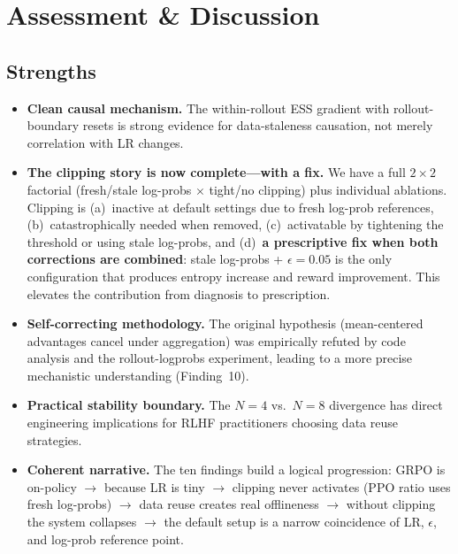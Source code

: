 \documentclass[11pt,a4paper]{article}
\begin{document}
\section{Assessment \& Discussion}
\label{sec:assessment}

\subsection{Strengths}

\begin{itemize}[leftmargin=*]
  \item \textbf{Clean causal mechanism.} The within-rollout ESS gradient with
    rollout-boundary resets is strong evidence for data-staleness causation,
    not merely correlation with LR changes.

  \item \textbf{The clipping story is now complete---with a fix.} We have a
    full $2 \times 2$ factorial (fresh/stale log-probs $\times$
    tight/no clipping) plus individual ablations. Clipping is (a)~inactive at
    default settings due to fresh log-prob references, (b)~catastrophically
    needed when removed, (c)~activatable by tightening the threshold or
    using stale log-probs, and (d)~\textbf{a prescriptive fix when both
    corrections are combined}: stale log-probs + $\epsilon = 0.05$ is the
    only configuration that produces entropy increase and reward improvement.
    This elevates the contribution from diagnosis to prescription.

  \item \textbf{Self-correcting methodology.} The original hypothesis
    (mean-centered advantages cancel under aggregation) was empirically
    refuted by code analysis and the rollout-logprobs experiment, leading
    to a more precise mechanistic understanding (Finding~10).

  \item \textbf{Practical stability boundary.} The $N = 4$ vs.\ $N = 8$
    divergence has direct engineering implications for RLHF practitioners
    choosing data reuse strategies.

  \item \textbf{Coherent narrative.} The ten findings build a logical
    progression: GRPO is on-policy $\to$ because LR is tiny $\to$ clipping
    never activates (PPO ratio uses fresh log-probs) $\to$ data reuse creates
    real offlineness $\to$ without clipping the system collapses $\to$ the
    default setup is a narrow coincidence of LR, $\epsilon$, and log-prob
    reference point.
\end{itemize}
\end{document}
